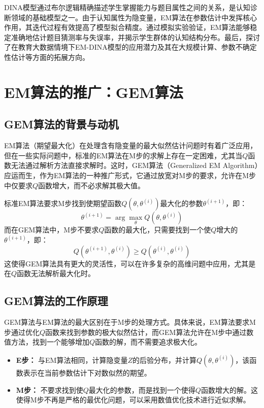 \documentclass[a4paper,12pt]{ctexart} %
\begin{document}
\begin{learnbox}{\kaishu
    DINA模型通过布尔逻辑精确描述学生掌握能力与题目属性之间的关系，是认知诊断领域的基础模型之一。由于认知属性为隐变量，EM算法在参数估计中发挥核心作用，其迭代过程有效提高了模型拟合精度。通过模拟实验验证，EM算法能够稳定准确地估计题目猜测率与失误率，并揭示学生群体的认知结构分布。最后，探讨了在教育大数据情境下EM-DINA模型的应用潜力及其在大规模计算、参数不确定性估计等方面的拓展方向。
    }
\end{learnbox}

\section{EM算法的推广：GEM算法}

\subsection{GEM算法的背景与动机}

EM算法（期望最大化）在处理含有隐变量的最大似然估计问题时有着广泛应用，但在一些实际问题中，标准的EM算法在M步的求解上存在一定困难，尤其当$Q$函数无法通过解析方法直接求解时。这时，GEM算法（Generalized EM Algorithm）应运而生，作为EM算法的一种推广形式，它通过放宽对M步的要求，允许在M步中仅要求$Q$函数增大，而不必求解其极大值。

标准EM算法要求M步找到使期望函数$Q(\theta, \theta^{(i)})$最大化的参数$\theta^{(i+1)}$，即：
\begin{equation}
\theta^{(i+1)} = \arg \max_{\theta} Q(\theta, \theta^{(i)})
\end{equation}
而在GEM算法中，M步不要求$Q$函数的最大化，只需要找到一个使$Q$增大的$\theta^{(i+1)}$，即：
\begin{equation}
Q(\theta^{(i+1)}, \theta^{(i)}) \geq Q(\theta^{(i)}, \theta^{(i)})
\end{equation}
这使得GEM算法具有更大的灵活性，可以在许多复杂的高维问题中应用，尤其是在$Q$函数无法解析最大化时。

\subsection{GEM算法的工作原理}

GEM算法与EM算法的最大区别在于M步的处理方式。具体来说，EM算法要求M步通过优化$Q$函数来找到参数的极大似然估计，而GEM算法允许在M步中通过数值方法，找到一个能够增加$Q$函数的解，而不需要追求极大化。

\begin{itemize}
    \item \textbf{E步：} 与EM算法相同，计算隐变量$Z$的后验分布，并计算$Q(\theta, \theta^{(i)})$，该函数表示在当前参数估计下对数似然的期望。
    \item \textbf{M步：} 不要求找到使$Q$最大化的参数，而是找到一个使得$Q$函数增大的解。这使得M步不再是严格的最优化问题，可以采用数值优化技术进行近似求解。
\end{itemize}
\end{document}
